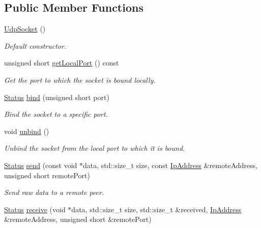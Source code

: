 \subsection*{Public Member Functions}
\begin{DoxyCompactItemize}
\item 
\hypertarget{classsf_1_1UdpSocket_abb10725e26dee9d3a8165fe87ffb71bb}{\hyperlink{classsf_1_1UdpSocket_abb10725e26dee9d3a8165fe87ffb71bb}{Udp\-Socket} ()}\label{classsf_1_1UdpSocket_abb10725e26dee9d3a8165fe87ffb71bb}

\begin{DoxyCompactList}\small\item\em Default constructor. \end{DoxyCompactList}\item 
unsigned short \hyperlink{classsf_1_1UdpSocket_a8ce625debd4b1f885366a69faa270086}{get\-Local\-Port} () const 
\begin{DoxyCompactList}\small\item\em Get the port to which the socket is bound locally. \end{DoxyCompactList}\item 
\hyperlink{classsf_1_1Socket_a51bf0fd51057b98a10fbb866246176dc}{Status} \hyperlink{classsf_1_1UdpSocket_ab0bf8d32849836f92beb2fd734565481}{bind} (unsigned short port)
\begin{DoxyCompactList}\small\item\em Bind the socket to a specific port. \end{DoxyCompactList}\item 
void \hyperlink{classsf_1_1UdpSocket_a2c4abb8102a1bd31f51fcfe7f15427a3}{unbind} ()
\begin{DoxyCompactList}\small\item\em Unbind the socket from the local port to which it is bound. \end{DoxyCompactList}\item 
\hyperlink{classsf_1_1Socket_a51bf0fd51057b98a10fbb866246176dc}{Status} \hyperlink{classsf_1_1UdpSocket_a664ab8f26f37c21cc4de1b847c2efcca}{send} (const void $\ast$data, std\-::size\-\_\-t size, const \hyperlink{classsf_1_1IpAddress}{Ip\-Address} \&remote\-Address, unsigned short remote\-Port)
\begin{DoxyCompactList}\small\item\em Send raw data to a remote peer. \end{DoxyCompactList}\item 
\hyperlink{classsf_1_1Socket_a51bf0fd51057b98a10fbb866246176dc}{Status} \hyperlink{classsf_1_1UdpSocket_ade9ca0f7ed7919136917b0b997a9833a}{receive} (void $\ast$data, std\-::size\-\_\-t size, std\-::size\-\_\-t \&received, \hyperlink{classsf_1_1IpAddress}{Ip\-Address} \&remote\-Address, unsigned short \&remote\-Port)

\end{DoxyCompactItemize}
